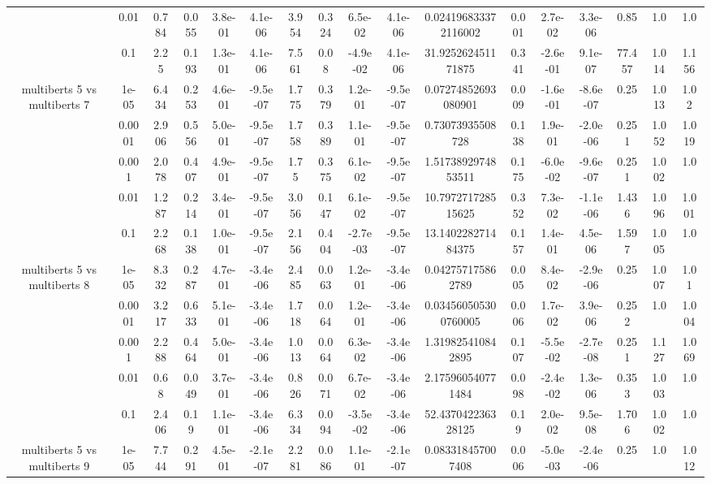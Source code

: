 \begin{tabular}{|c|c|c|c|c|c|c|c|c|c|c|c|c|c|c|c|c|}
 & 0.01 & 0.784 & 0.055 & 3.8e-01 & 4.1e-06 & 3.954 & 0.324 & 6.5e-02 & 4.1e-06 & 0.024196833372116002 & 0.001 & 2.7e-02 & 3.3e-06 & 0.85 & 1.0 & 1.0 \\
 & 0.1 & 2.25 & 0.193 & 1.3e-01 & 4.1e-06 & 7.561 & 0.08 & -4.9e-02 & 4.1e-06 & 31.925262451171875 & 0.341 & -2.6e-01 & 9.1e-07 & 77.457 & 1.014 & 1.156 \\
\hline
\multirow{5}{*}{multiberts 5 vs multiberts 7} & 1e-05 & 6.434 & 0.253 & 4.6e-01 & -9.5e-07 & 1.775 & 0.379 & 1.2e-01 & -9.5e-07 & 0.07274852693080901 & 0.009 & -1.6e-01 & -8.6e-07 & 0.25 & 1.013 & 1.02 \\
 & 0.0001 & 2.906 & 0.556 & 5.0e-01 & -9.5e-07 & 1.758 & 0.389 & 1.1e-01 & -9.5e-07 & 0.73073935508728 & 0.138 & 1.9e-01 & -2.0e-06 & 0.251 & 1.052 & 1.019 \\
 & 0.001 & 2.078 & 0.407 & 4.9e-01 & -9.5e-07 & 1.75 & 0.375 & 6.1e-02 & -9.5e-07 & 1.5173892974853511 & 0.175 & -6.0e-02 & -9.6e-07 & 0.251 & 1.002 & 1.0 \\
 & 0.01 & 1.287 & 0.214 & 3.4e-01 & -9.5e-07 & 3.056 & 0.147 & 6.1e-02 & -9.5e-07 & 10.797271728515625 & 0.352 & 7.3e-02 & -1.1e-06 & 1.436 & 1.096 & 1.001 \\
 & 0.1 & 2.268 & 0.138 & 1.0e-01 & -9.5e-07 & 2.156 & 0.404 & -2.7e-03 & -9.5e-07 & 13.140228271484375 & 0.157 & 1.4e-01 & 4.5e-06 & 1.597 & 1.005 & 1.0 \\
\hline
\multirow{5}{*}{multiberts 5 vs multiberts 8} & 1e-05 & 8.332 & 0.287 & 4.7e-01 & -3.4e-06 & 2.485 & 0.063 & 1.2e-01 & -3.4e-06 & 0.042757175862789 & 0.005 & 8.4e-02 & -2.9e-06 & 0.25 & 1.007 & 1.01 \\
 & 0.0001 & 3.217 & 0.633 & 5.1e-01 & -3.4e-06 & 1.718 & 0.064 & 1.2e-01 & -3.4e-06 & 0.034560505300760005 & 0.006 & 1.7e-02 & 3.9e-06 & 0.252 & 1.0 & 1.004 \\
 & 0.001 & 2.288 & 0.464 & 5.0e-01 & -3.4e-06 & 1.013 & 0.064 & 6.3e-02 & -3.4e-06 & 1.319825410842895 & 0.107 & -5.5e-02 & -2.7e-08 & 0.251 & 1.127 & 1.069 \\
 & 0.01 & 0.68 & 0.049 & 3.7e-01 & -3.4e-06 & 0.826 & 0.071 & 6.7e-02 & -3.4e-06 & 2.175960540771484 & 0.098 & -2.4e-02 & 1.3e-06 & 0.353 & 1.003 & 1.0 \\
 & 0.1 & 2.406 & 0.19 & 1.1e-01 & -3.4e-06 & 6.334 & 0.094 & -3.5e-02 & -3.4e-06 & 52.437042236328125 & 0.19 & 2.0e-02 & 9.5e-08 & 1.706 & 1.002 & 1.0 \\
\hline
\multirow{5}{*}{multiberts 5 vs multiberts 9} & 1e-05 & 7.744 & 0.291 & 4.5e-01 & -2.1e-07 & 2.281 & 0.086 & 1.1e-01 & -2.1e-07 & 0.083318457007408 & 0.006 & -5.0e-03 & -2.4e-06 & 0.25 & 1.0 & 1.012 \\

\end{tabular}

